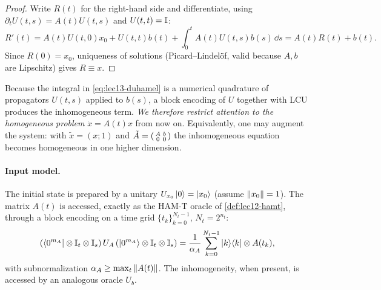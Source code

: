 \begin{proof}
Write $R(t)$ for the right-hand side and differentiate, using $\partial_t U(t,s)=A(t)U(t,s)$
and $U(t,t)=\mathbb{I}$:
\[
  R'(t)=A(t)U(t,0)x_0+U(t,t)b(t)+\int_0^t A(t)U(t,s)b(s)\,\dd s
       =A(t)R(t)+b(t).
\]
Since $R(0)=x_0$, uniqueness of solutions (Picard--Lindel\"of, valid because $A,b$ are
Lipschitz) gives $R\equiv x$.
\end{proof}

Because the integral in \eqref{eq:lec13-duhamel} is a numerical quadrature of propagators
$U(t,s)$ applied to $b(s)$, a block encoding of $U$ together with LCU produces the
inhomogeneous term. \emph{We therefore restrict attention to the homogeneous problem}
$\dot x=A(t)x$ from now on. Equivalently, one may augment the system: with
$\tilde x=(x;1)$ and $\tilde A=\begin{psmallmatrix}A&b\\0&0\end{psmallmatrix}$ the inhomogeneous
equation becomes homogeneous in one higher dimension.

\paragraph{Input model.}
The initial state is prepared by a unitary $U_{x_0}\ket{0}=\ket{x_0}$ (assume $\left\lVert x_0 \right\rVert=1$).
The matrix $A(t)$ is accessed, exactly as the $\mathrm{HAM\text{-}T}$ oracle of
\cref{def:lec12-hamt}, through a block encoding on a time grid $\{t_k\}_{k=0}^{N_t-1}$,
$N_t=2^{n_t}$:
\begin{equation}
  (\bra{0^{m_A}}\otimes\mathbb{I}_t\otimes\mathbb{I}_s)\,U_A\,(\ket{0^{m_A}}\otimes\mathbb{I}_t\otimes\mathbb{I}_s)
  =\frac{1}{\alpha_A}\sum_{k=0}^{N_t-1}\ket{k}\!\bra{k}\otimes A(t_k),
  \label{eq:lec13-UA}
\end{equation}
with subnormalization $\alpha_A\ge\max_t\left\lVert A(t) \right\rVert$. The inhomogeneity, when present, is
accessed by an analogous oracle $U_b$.

